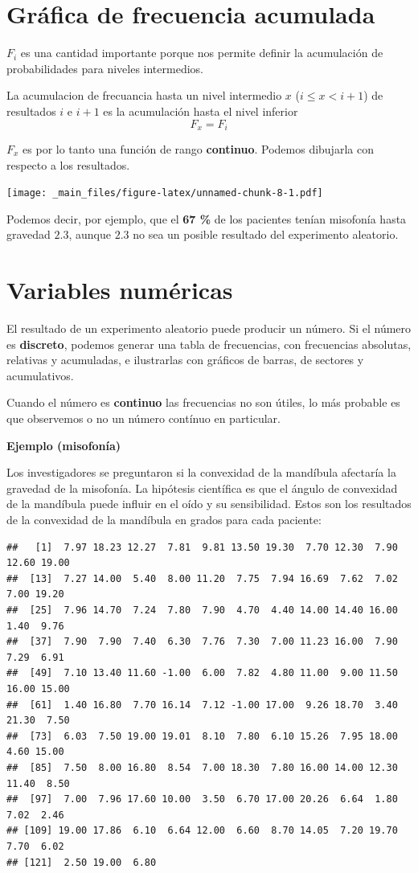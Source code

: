 \documentclass[
]{book}
\begin{document}
\hypertarget{gruxe1fica-de-frecuencia-acumulada}{%
\section{Gráfica de frecuencia acumulada}\label{gruxe1fica-de-frecuencia-acumulada}}

\(F_i\) es una cantidad importante porque nos permite definir la acumulación de probabilidades para niveles intermedios.

La acumulaci\textquotesingle on de frecuancia hasta un nivel intermedio \(x\) (\(i\leq x< i+1\)) de resultados \(i\) e \(i+1\) es la acumulación hasta el nivel inferior \[F_x=F_i\]

\(F_x\) es por lo tanto una función de rango \textbf{continuo}. Podemos dibujarla con respecto a los resultados.

\texttt{[image: \_main\_files/figure-latex/unnamed-chunk-8-1.pdf]}

Podemos decir, por ejemplo, que el \textbf{67 \%} de los pacientes tenían misofonía hasta gravedad \(2.3\), aunque \(2.3\) no sea un posible resultado del experimento aleatorio.

\hypertarget{variables-numuxe9ricas}{%
\section{Variables numéricas}\label{variables-numuxe9ricas}}

El resultado de un experimento aleatorio puede producir un número. Si el número es \textbf{discreto}, podemos generar una tabla de frecuencias, con frecuencias absolutas, relativas y acumuladas, e ilustrarlas con gráficos de barras, de sectores y acumulativos.

Cuando el número es \textbf{continuo} las frecuencias no son útiles, lo más probable es que observemos o no un número contínuo en particular.

\textbf{Ejemplo (misofonía)}

Los investigadores se preguntaron si la convexidad de la mandíbula afectaría la gravedad de la misofonía. La hipótesis científica es que el ángulo de convexidad de la mandíbula puede influir en el oído y su sensibilidad. Estos son los resultados de la convexidad de la mandíbula en grados para cada paciente:

\begin{verbatim}
##   [1]  7.97 18.23 12.27  7.81  9.81 13.50 19.30  7.70 12.30  7.90 12.60 19.00
##  [13]  7.27 14.00  5.40  8.00 11.20  7.75  7.94 16.69  7.62  7.02  7.00 19.20
##  [25]  7.96 14.70  7.24  7.80  7.90  4.70  4.40 14.00 14.40 16.00  1.40  9.76
##  [37]  7.90  7.90  7.40  6.30  7.76  7.30  7.00 11.23 16.00  7.90  7.29  6.91
##  [49]  7.10 13.40 11.60 -1.00  6.00  7.82  4.80 11.00  9.00 11.50 16.00 15.00
##  [61]  1.40 16.80  7.70 16.14  7.12 -1.00 17.00  9.26 18.70  3.40 21.30  7.50
##  [73]  6.03  7.50 19.00 19.01  8.10  7.80  6.10 15.26  7.95 18.00  4.60 15.00
##  [85]  7.50  8.00 16.80  8.54  7.00 18.30  7.80 16.00 14.00 12.30 11.40  8.50
##  [97]  7.00  7.96 17.60 10.00  3.50  6.70 17.00 20.26  6.64  1.80  7.02  2.46
## [109] 19.00 17.86  6.10  6.64 12.00  6.60  8.70 14.05  7.20 19.70  7.70  6.02
## [121]  2.50 19.00  6.80
\end{verbatim}
\end{document}
